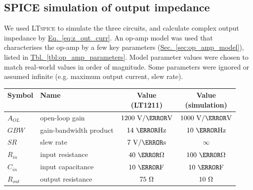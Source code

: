 \documentclass[10pt]{article}
\makeatletter
\newcommand{\specialcell}[2][c]{%
  \begin{tabular}[#1]{@{}l@{}}#2\end{tabular}}
\newcommand{\briefeqlink}[1]{\hyperref[#1]{Eq.~\ref*{#1}}\xspace }
\newcommand{\tablelink}[1]{\hyperref[#1]{Tbl.~\ref*{#1}}\xspace }
\newcommand{\briefseclink}[1]{\hyperref[#1]{Sec.~\ref*{#1}}}
\makeatother
\begin{document}
\subsection{SPICE simulation of output impedance}
\label{sec:spice_output_resistance}

We used \textsc{LTspice} \cite{ltspice} to simulate the three circuits, and calculate complex output impedance by \briefeqlink{eq:z_out_curr}. An op-amp model was used that characterises the op-amp by a few key parameters (\briefseclink{sec:op_amp_model}), listed in \tablelink{tbl:op_amp_parameters}. Model parameter values were chosen to match real-world values in order of magnitude. Some parameters were ignored or assumed infinite (e.g. maximum output current, slew rate).

\begin{table}[b!]
\centering
\bgroup
\def\arraystretch{1.3}%
\begin{tabularx}{.95\textwidth}{ a|b|c|c }
\specialcell{Symbol \\\ } & \specialcell{Name \\\ } & \specialcell{Value \\ (LT1211)} & \specialcell{Value\\ (simulation)} \\
\hline
{} $A_{OL}$ &  open-loop gain &  $1200~\volt/\milli\volt$ &  $1000~\volt/\milli\volt$ \\
 $GBW$ &  gain-bandwidth product &  $14~\mega\hertz$ &  $10~\mega\hertz$ \\
 $SR$ &  slew rate &  $7~\volt/\micro\second$ &  $\infty$ \\
 $R_{in}$ &  input resistance &  $40~\mega\ohm$ &  $100~\mega\ohm$ \\
 $C_{in}$ &  input capacitance &  $10~\pico\farad$ &  $10~\pico\farad$ \\
 $R_{out}$ &  output resistance &  $75~\ohm$ &  $10~\ohm$ \\

\end{tabularx}
\end{table}
\end{document}
